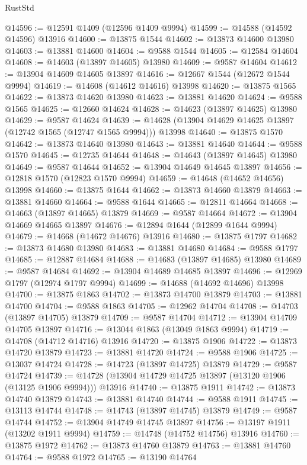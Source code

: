 \begin{lexlean}{RustStd}
\begin{coremodule}
@14596 := @12591 @1409 (@12596 @1409 @9994)
@14599 := @14588 (@14592 @14596) @13916
@14600 := @13875 @1544
@14602 := @13873 @14600 @13980
@14603 := @13881 @14600
@14604 := @9588 @1544
@14605 := @12584 @14604
@14608 := @14603 (@13897 @14605) @13980
@14609 := @9587 @14604
@14612 := @13904 @14609 @14605 @13897
@14616 := @12667 @1544 (@12672 @1544 @9994)
@14619 := @14608 (@14612 @14616) @13998
@14620 := @13875 @1565
@14622 := @13873 @14620 @13980
@14623 := @13881 @14620
@14624 := @9588 @1565
@14625 := @12660 @14624
@14628 := @14623 (@13897 @14625) @13980
@14629 := @9587 @14624
@14639 := @14628 (@13904 @14629 @14625 @13897 (@12742 @1565 (@12747 @1565 @9994))) @13998
@14640 := @13875 @1570
@14642 := @13873 @14640 @13980
@14643 := @13881 @14640
@14644 := @9588 @1570
@14645 := @12735 @14644
@14648 := @14643 (@13897 @14645) @13980
@14649 := @9587 @14644
@14652 := @13904 @14649 @14645 @13897
@14656 := @12818 @1570 (@12823 @1570 @9994)
@14659 := @14648 (@14652 @14656) @13998
@14660 := @13875 @1644
@14662 := @13873 @14660 @13879
@14663 := @13881 @14660
@14664 := @9588 @1644
@14665 := @12811 @14664
@14668 := @14663 (@13897 @14665) @13879
@14669 := @9587 @14664
@14672 := @13904 @14669 @14665 @13897
@14676 := @12894 @1644 (@12899 @1644 @9994)
@14679 := @14668 (@14672 @14676) @13916
@14680 := @13875 @1797
@14682 := @13873 @14680 @13980
@14683 := @13881 @14680
@14684 := @9588 @1797
@14685 := @12887 @14684
@14688 := @14683 (@13897 @14685) @13980
@14689 := @9587 @14684
@14692 := @13904 @14689 @14685 @13897
@14696 := @12969 @1797 (@12974 @1797 @9994)
@14699 := @14688 (@14692 @14696) @13998
@14700 := @13875 @1863
@14702 := @13873 @14700 @13879
@14703 := @13881 @14700
@14704 := @9588 @1863
@14705 := @12962 @14704
@14708 := @14703 (@13897 @14705) @13879
@14709 := @9587 @14704
@14712 := @13904 @14709 @14705 @13897
@14716 := @13044 @1863 (@13049 @1863 @9994)
@14719 := @14708 (@14712 @14716) @13916
@14720 := @13875 @1906
@14722 := @13873 @14720 @13879
@14723 := @13881 @14720
@14724 := @9588 @1906
@14725 := @13037 @14724
@14728 := @14723 (@13897 @14725) @13879
@14729 := @9587 @14724
@14739 := @14728 (@13904 @14729 @14725 @13897 (@13120 @1906 (@13125 @1906 @9994))) @13916
@14740 := @13875 @1911
@14742 := @13873 @14740 @13879
@14743 := @13881 @14740
@14744 := @9588 @1911
@14745 := @13113 @14744
@14748 := @14743 (@13897 @14745) @13879
@14749 := @9587 @14744
@14752 := @13904 @14749 @14745 @13897
@14756 := @13197 @1911 (@13202 @1911 @9994)
@14759 := @14748 (@14752 @14756) @13916
@14760 := @13875 @1972
@14762 := @13873 @14760 @13879
@14763 := @13881 @14760
@14764 := @9588 @1972
@14765 := @13190 @14764

\end{coremodule}
\end{lexlean}
